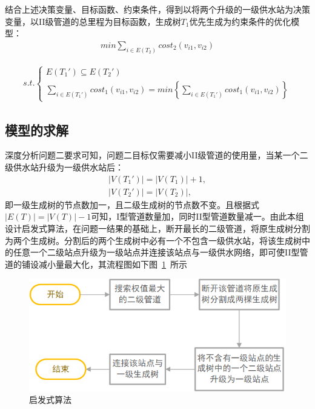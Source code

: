 \documentclass{whutmod}
\begin{document}
			结合上述决策变量、目标函数、约束条件，得到以将两个升级的一级供水站为决策变量，以II级管道的总里程为目标函数，生成树$T_1$优先生成为约束条件的优化模型：
			\begin{gather*}
			min  \sum_{i\in E(T_2) }cost_2(v_{i1},v_{i2})
			\end{gather*}
			
			\begin{gather*}
			s.t.\left\{\begin{matrix}
			E(T_{1}')\subseteq  E(T_{2}')\\ 
			\sum_{i\in E(T_1') }cost_1(v_{i1},v_{i2})=min\left \{ 	\sum_{i\in E(T_1') }cost_1(v_{i1},v_{i2}) \right \} 
			\end{matrix}\right.
			\end{gather*}
		\subsection{模型的求解}
		深度分析问题二要求可知，问题二目标仅需要减小II级管道的使用量，当某一个二级供水站升级为一级供水站后：
			\begin{gather*}
			|V(T_{1}')|= |V(T_{1})|+1,\\
			|V(T_{2}')|=|V(T_{2})|,
	        \end{gather*}
	    即一级生成树的节点数加一，且二级生成树的节点数不变。且根据式$|E(T)|=|V(T)|-1 $可知，I型管道数量加，同时II型管道数量减一。由此本组设计启发式算法，在问题一结果的基础上，断开最长的二级管道，将原生成树分割为两个生成树。分割后的两个生成树中必有一个不包含一级供水站，将该生成树中的任意一个二级站点升级为一级站点并连接该站点与一级供水网络，即可使II型管道的铺设减小量最大化，其流程图如下图~\ref{gfhssssd}~所示
	        \begin{figure}[H]
	        	\centering
	        	\includegraphics[width=\textwidth]{figures/2163.png}
	        	\caption{启发式算法}\label{gfhssssd}
	        \end{figure}
\end{document}
